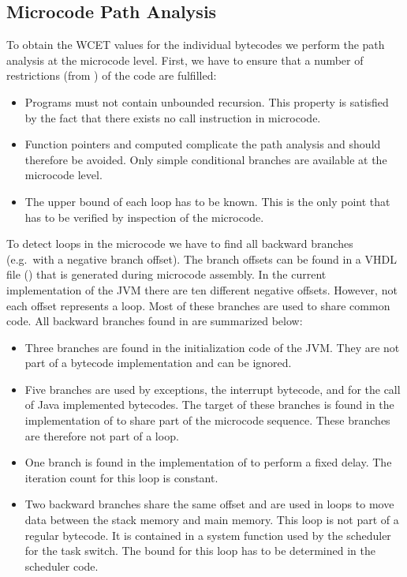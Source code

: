 \subsection{Microcode Path Analysis}

To obtain the WCET values for the individual bytecodes we perform
the path analysis at the microcode level. First, we have to ensure
that a number of restrictions (from \cite{84850}) of the code are
fulfilled:
%
\begin{itemize}
    \item Programs must not contain unbounded recursion. This property
    is satisfied by the fact that there exists no call instruction in
    microcode.
    \item Function pointers and computed  complicate the
    path analysis and should therefore be avoided. Only simple conditional
    branches are available at the microcode level.
    \item The upper bound of each loop has to be known. This is the only
    point that has to be verified by inspection of the microcode.
\end{itemize}
%
To detect loops in the microcode we have to find all backward
branches (e.g.\ with a negative branch offset). The branch offsets
can be found in a VHDL file () that is generated
during microcode assembly. In the current implementation of the JVM
there are ten different negative offsets. However, not each offset
represents a loop. Most of these branches are used to share common
code. All backward branches found in  are summarized
below:
\begin{itemize}
    \item Three branches are found in the initialization code of the
    JVM. They are not part of a bytecode implementation and can be
    ignored.
    \item Five branches are used by exceptions, the interrupt
    bytecode, and for the call of Java implemented bytecodes. The target
    of these branches is found in the implementation of 
    to share part of the microcode sequence. These branches are therefore not
    part of a loop.
    \item One branch is found in the implementation of  to
    perform a fixed delay. The iteration count for this loop is constant.
    \item Two backward branches share the same offset and are used
    in loops to move data between the stack memory and main memory.
    This loop is not part of a regular bytecode. It is contained in
    a system function used by the scheduler for the task switch.
    The bound for this loop has to be determined in the scheduler
    code.
\end{itemize}
